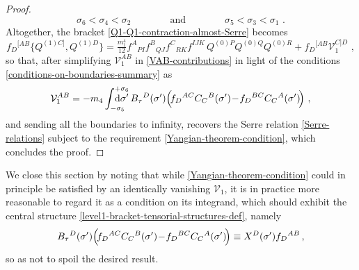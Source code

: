 \documentclass[12pt]{article}
\numberwithin{equation}{section}
\begin{document}
\begin{proof}
\begin{equation}\label{conditions-on-boundaries-summary}
\sigma_{6}<\sigma_{4}<\sigma_{2} 
\qquad \qquad \text{and} \qquad \qquad 
\sigma_{5}<\sigma_{3}<\sigma_{1} \,\, .
\end{equation}
Altogether, the bracket \eqref{Q1-Q1-contraction-almost-Serre} becomes
\begin{equation}\label{Q1-Q1-contraction-really-almost-Serre}
f_{D}{}^{[AB}\{Q^{(1)C]},Q^{(1)D}\} =\tfrac{m_{1}^4}{12}f^{A}{}_{PI}f^{B}{}_{QJ}f^{C}{}_{RK}f^{IJK} \, Q^{(0)P}Q^{(0)Q}Q^{(0)R}+f_{D}{}^{[AB}\mathcal{V}_{1}^{C]D} \,\, ,
\end{equation}
so that, after simplifying $\mathcal{V}_{1}^{AB}$ in \eqref{VAB-contributions} in light of the conditions \eqref{conditions-on-boundaries-summary} as
\begin{equation}
\mathcal{V}_{1}^{AB}=-m_{4}\int_{-\sigma_{5}}^{+\sigma_{6}}\!\!\!\!\!\!\!\!\!\!\mathrm{d}\sigma' \,   B_{\tau}{}^{D}(\sigma')\Bigl(\!f_{D}{}^{AC}C_{C}{}^{B}(\sigma')\!-\!f_{D}{}^{BC}C_{C}{}^{A}(\sigma')\!\Bigr) \,\, ,
\end{equation}
and sending all the boundaries to infinity, recovers the Serre relation \eqref{Serre-relations} subject to the requirement \eqref{Yangian-theorem-condition}, which concludes the proof.
\end{proof}
We close this section by noting that while \eqref{Yangian-theorem-condition} could in principle be satisfied by an identically vanishing $\mathcal{V}_{1}$, it is in practice more reasonable to regard it as a condition on its integrand, which should exhibit the central structure \eqref{level1-bracket-tensorial-structures-def}, namely
\begin{equation}\label{B-C-relation}
B_{\tau}{}^{D}(\sigma')\Bigl(\!f_{D}{}^{AC}C_{C}{}^{B}(\sigma')\!-\!f_{D}{}^{BC}C_{C}{}^{A}(\sigma')\!\Bigr)\equiv X^{D}(\sigma')f_{D}{}^{AB} \, ,
\end{equation}
so as not to spoil the desired result. 
\end{document}
